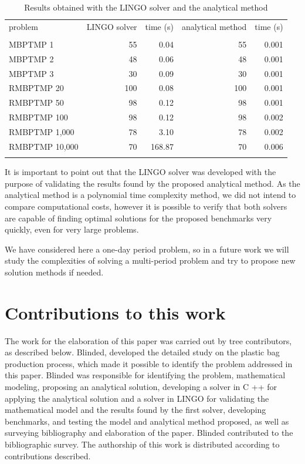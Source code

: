 \documentclass[authoryear,preprint,12pt]{elsarticle}
\begin{document}
\begin{table}[h]
\begin{center}
\begin{footnotesize}
\begin{tabular}[c]{l r r r r}
problem & LINGO solver & time (s) & analytical method & time (s) \\
\cline {1-5} \\
MBPTMP 1 & 55 & 0.04 & 55 & 0.001 \\
MBPTMP 2 & 48 & 0.06 & 48 & 0.001 \\
MBPTMP 3 & 30 & 0.09 & 30 & 0.001 \\
RMBPTMP 20 & 100 & 0.08 & 100 & 0.001 \\
RMBPTMP 50 & 98 & 0.12 & 98 & 0.001\\
RMBPTMP 100 & 98 & 0.12 & 98 & 0.002\\
RMBPTMP 1,000 & 78 & 3.10 & 78 & 0.002\\
RMBPTMP 10,000 & 70 & 168.87 & 70 & 0.006 \\
\cline {1-5} \\
\end{tabular}
\caption{Results obtained with the LINGO solver and the analytical method}
\label{tab:results}
\end{footnotesize}
\end{center}
\end{table}

It is important to point out that the LINGO solver was developed with the purpose of validating the results found by the proposed analytical method. As the analytical method is a polynomial time complexity method, we did not intend to compare computational costs, however it is possible to verify that both solvers are capable of finding optimal solutions for the proposed benchmarks very quickly, even for very large problems.

We have considered here a one-day period problem, so in a future work we will study the complexities of solving a multi-period problem and try to propose new solution methods if needed. 


\section{Contributions to this work}
\label{sec:contributions}

The work for the elaboration of this paper was carried out by tree contributors, as described below. Blinded, developed the detailed study on the plastic bag production process, which made it possible to identify the problem addressed in this paper. Blinded was responsible for identifying the problem, mathematical modeling, proposing an analytical solution, developing a solver in C ++ for applying the analytical solution and a solver in LINGO for validating the mathematical model and the results found by the first solver, developing benchmarks, and testing the model and analytical method proposed, as well as surveying bibliography and elaboration of the paper. Blinded contributed to the bibliographic survey. The authorship of this work is distributed according to contributions described.
\end{document}
